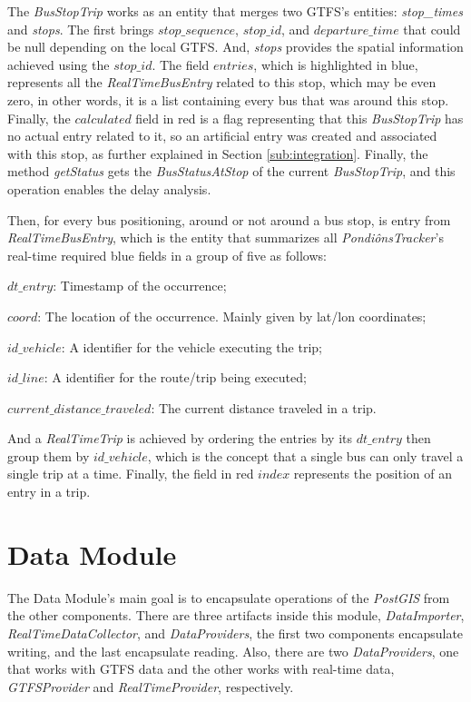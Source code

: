 The \textit{BusStopTrip} works as an entity that merges two GTFS's entities: \textit{stop\_times} and \textit{stops}. The first brings $stop\_sequence$, $stop\_id$, and $departure\_time$ that could be null
depending on the local GTFS. And, \textit{stops} provides the spatial information achieved 
using the $stop\_id$. The field $entries$, which is highlighted in blue, represents all the \textit{RealTimeBusEntry} related to this stop, which may be even zero, in other words, it is a
list containing every bus that was around this stop. Finally, the $calculated$ field in red
is a flag representing that this \textit{BusStopTrip} has no actual entry related to it, so an artificial 
entry was created and associated with this stop, as further explained in Section \ref{sub:integration}.
Finally, the method \textit{getStatus} gets the \textit{BusStatusAtStop} of the current \textit{BusStopTrip}, and this operation enables the delay analysis.

Then, for every bus positioning, around or not around a bus stop,
is entry from \textit{RealTimeBusEntry}, which is the entity that summarizes 
all \textit{PondiônsTracker}'s real-time required blue fields in a group of five as 
follows:
\begin{enumerate*}
    \item $dt\_entry$: Timestamp of the occurrence;
    \item $coord$: The location of the occurrence. Mainly given by lat/lon coordinates;
    \item $id\_vehicle$: A identifier for the vehicle executing the trip;
    \item $id\_line$: A identifier for the route/trip being executed;
    \item $current\_distance\_traveled$: The current distance traveled in a trip.
\end{enumerate*}
And a \textit{RealTimeTrip} is achieved by ordering the entries by its $dt\_entry$ 
then group them by $id\_vehicle$, which is the concept that a single bus can only travel
a single trip at a time. Finally, the field in red $index$ represents the position of an
entry in a trip.


\section{Data Module}
The Data Module's main goal is to encapsulate 
operations of the \textit{PostGIS} from the other components. 
There are three artifacts inside this module, 
\textit{DataImporter},
\textit{RealTimeDataCollector},
and \textit{DataProviders}, 
the first two components encapsulate writing, and the last encapsulate reading.
Also, there are two \textit{DataProviders}, one that works with GTFS data and the
other works with real-time data, \textit{GTFSProvider} and \textit{RealTimeProvider},
respectively.

